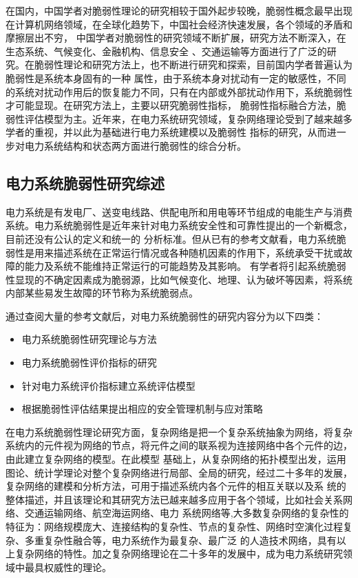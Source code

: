 在国内，中国学者对脆弱性理论的研究相较于国外起步较晚，脆弱性概念最早出现在计算机网络领域\cite{refs17}，在全球化趋势下，中国社会经济快速发展，各个领域的矛盾和摩擦层出不穷，
中国学者对脆弱性的研究领域不断扩展，研究方法不断深入，在生态系统\cite{refs18,refs19}、气候变化\cite{refs20,refs21}、金融机构\cite{refs22,refs23,refs24}、信息安全
\cite{refs25,refs26}、交通运输\cite{refs27,refs28}等方面进行了广泛的研究。在脆弱性理论和研究方法上，也不断进行研究和探索，目前国内学者普遍认为脆弱性是系统本身固有的一种
属性，由于系统本身对扰动有一定的敏感性，不同的系统对扰动作用后的恢复能力不同，只有在内部或外部扰动作用下，系统脆弱性才可能显现。在研究方法上，主要以研究脆弱性指标\cite{refs29}，
脆弱性指标融合方法\cite{refs30}，脆弱性评估模型为主。近年来，在电力系统研究领域，复杂网络理论\cite{refs31}受到了越来越多学者的重视，并以此为基础进行电力系统建模以及脆弱性
指标的研究，从而进一步对电力系统结构和状态两方面进行脆弱性的综合分析。


\subsection{电力系统脆弱性研究综述}
\label{sec:presentPowerSys}
电力系统是有发电厂、送变电线路、供配电所和用电等环节组成的电能生产与消费系统。电力系统脆弱性是近年来针对电力系统安全性和可靠性提出的一个新概念，目前还没有公认的定义和统一的
分析标准。但从已有的参考文献看，电力系统脆弱性是用来描述系统在正常运行情况或各种随机因素的作用下，系统承受干扰或故障的能力及系统不能维持正常运行的可能趋势及其影响\cite{refs32}。
有学者将引起系统脆弱性显现的不确定因素成为脆弱源，比如气候变化、地理、认为破坏等因素，将系统内部某些易发生故障的环节称为系统脆弱点。

通过查阅大量的参考文献后，对电力系统脆弱性的研究内容分为以下四类：
\begin{itemize}
  \item 电力系统脆弱性研究理论与方法
  \item 电力系统脆弱性评价指标的研究
  \item 针对电力系统评价指标建立系统评估模型
  \item 根据脆弱性评估结果提出相应的安全管理机制与应对策略 
\end{itemize}

在电力系统脆弱性理论研究方面，复杂网络是把一个复杂系统抽象为网络，将复杂系统内的元件视为网络的节点，将元件之间的联系视为连接网络中各个元件的边，由此建立复杂网络的模型。在此模型
基础上，从复杂网络的拓扑模型出发，运用图论、统计学理论对整个复杂网络进行局部、全局的研究，经过二十多年的发展，复杂网络的建模和分析方法，可用于描述系统内各个元件的相互关联以及系
统的整体描述，并且该理论和其研究方法已越来越多应用于各个领域，比如社会关系网络\cite{refs33}、交通运输网络\cite{refs34,refs35,refs36}、航空海运网络\cite{refs38,refs39}、电力
系统网络\cite{refs40,refs41}等,大多数复杂网络的复杂性的特征为：网络规模庞大、连接结构的复杂性、节点的复杂性、网络时空演化过程复杂、多重复杂性融合等，电力系统作为最复杂、最广泛
的人造技术网络，具有以上复杂网络的特性。加之复杂网络理论在二十多年的发展中，成为电力系统研究领域中最具权威性的理论。

